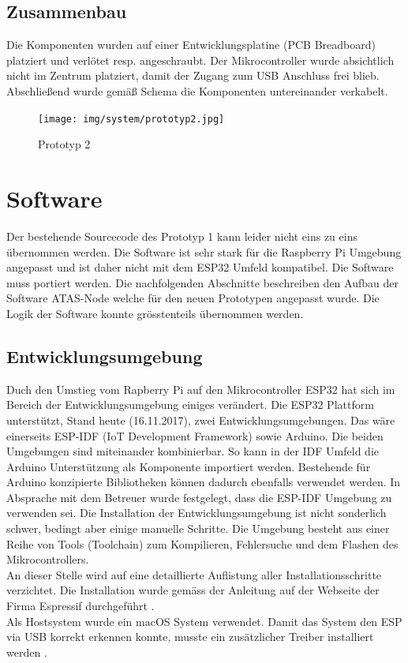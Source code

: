 \documentclass[11pt,english,german]{report}
\theoremstyle{definition}
\begin{document}
\newpage
\subsection{Zusammenbau}
Die Komponenten wurden auf einer Entwicklungsplatine (PCB Breadboard) platziert und verlötet resp. angeschraubt. Der Mikrocontroller wurde absichtlich nicht im Zentrum platziert, damit der Zugang zum USB Anschluss frei blieb. Abschließend wurde gemäß Schema die Komponenten untereinander verkabelt.\\
\begin{figure}[H]
	\centering
	\texttt{[image: img/system/prototyp2.jpg]}
	\caption[Prototyp 2]
	{Prototyp 2}
\end{figure}

\newpage
\section{Software}
Der bestehende Sourcecode des Prototyp 1 kann leider nicht eins zu eins übernommen werden. Die Software ist sehr stark für die Raspberry Pi Umgebung angepasst und ist daher nicht mit dem ESP32 Umfeld kompatibel. Die Software muss portiert werden. Die nachfolgenden Abschnitte beschreiben den Aufbau der Software ATAS-Node welche für den neuen Prototypen angepasst wurde. Die Logik der Software konnte grösstenteils übernommen werden. 

\subsection{Entwicklungsumgebung}
Duch den Umstieg vom Rapberry Pi auf den Mikrocontroller ESP32 hat sich im Bereich der Entwicklungsumgebung einiges verändert. Die ESP32 Plattform unterstützt, Stand heute (16.11.2017), zwei Entwicklungsumgebungen. Das wäre einerseits ESP-IDF (IoT Development Framework) sowie Arduino\cite{espidfarduino}. Die beiden Umgebungen sind miteinander kombinierbar. So kann in der IDF Umfeld die Arduino Unterstützung als Komponente importiert werden. Bestehende für Arduino konzipierte Bibliotheken können dadurch ebenfalls verwendet werden. In Absprache mit dem Betreuer wurde festgelegt, dass die ESP-IDF Umgebung zu verwenden sei. Die Installation der Entwicklungsumgebung ist nicht sonderlich schwer, bedingt aber einige manuelle Schritte. Die Umgebung besteht aus einer Reihe von Tools (Toolchain) zum Kompilieren, Fehlersuche und dem Flashen des Mikrocontrollers.\\[0.3cm]
An dieser Stelle wird auf eine detaillierte Auflistung aller Installationsschritte verzichtet. Die Installation wurde gemäss der Anleitung auf der Webseite der Firma Espressif durchgeführt \cite{espidfinstallation}.\\[0.3cm]
Als Hostsystem wurde ein macOS System verwendet. Damit das System den ESP via USB korrekt erkennen konnte, musste ein zusätzlicher Treiber installiert werden \cite{espidfdriver}. 
\end{document}
